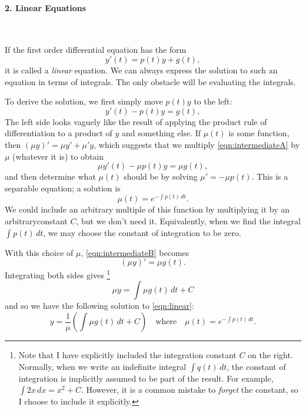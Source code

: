 \documentclass{book}
\begin{document}
\paragraph{2. Linear Equations} ~

\vspace{0.2cm}
\noindent
If the first order differential equation has the form
\begin{equation}
    y'(t) = p(t) y + g(t),
\label{eqn:linear}
\end{equation}
it is called a \emph{linear} equation.
We can always express the solution to such an equation
in terms of integrals.  The only obstacle will be
evaluating the integrals.

To derive the solution, we first simply move $p(t)y$ to the left:
\begin{equation}
    y'(t) - p(t) y =  g(t),
\label{eqn:intermediateA}
\end{equation}
The left side looks vaguely like the result of applying the
product rule of differentiation to a product of $y$ and something else.
If $\mu(t)$ is some function, then $(\mu y)' = \mu y' + \mu' y$,
which suggests that we multiply \eqref{eqn:intermediateA}
by $\mu$ (whatever it is)
to obtain
\begin{equation}
    \mu y'(t) - \mu p(t) y =  \mu g(t),
\label{eqn:intermediateB}
\end{equation}
and then determine what $\mu(t)$ should
be by solving $\mu' = -\mu p(t)$.
This is a separable equation; a solution is
\begin{equation}
   \mu(t) = e^{-\int p(t)\, dt}.
\end{equation}
We could include an arbitrary multiple of this function
by multiplying it by an arbitraryconstant $C$, but we
don't need it.  Equivalently, when we find the integral
$\int p(t)\,dt$, we may choose the constant of integration
to be zero.

With this choice of $\mu$, 
\eqref{eqn:intermediateB} becomes
\begin{equation}
    (\mu y)' =  \mu g(t).
\label{eqn:intermediateC}
\end{equation}
Integrating both sides gives%
\footnote{Note that I have explicitly included the integration
constant $C$ on the right.  Normally, when we write an indefinite
integral $\int q(t)\, dt$, the constant of integration is implicitly
assumed to be part of the result. For example, $\int 2x\,dx = x^2+C$.
However, it is a common mistake to \emph{forget} the constant, so
I choose to include it explicitly.}
\begin{equation}
    \mu y =  \int \mu g(t) \, dt + C
\label{eqn:intermediateD}
\end{equation}
and so we have the following solution
to \eqref{eqn:linear}:
\begin{equation}
    y =  \frac{1}{\mu}\left(\int \mu g(t) \, dt + C\right)
    \quad \textrm{where} \quad
    \mu(t) = e^{-\int p(t)\, dt}.
\label{eqn:linearsolution}
\end{equation}
\end{document}
